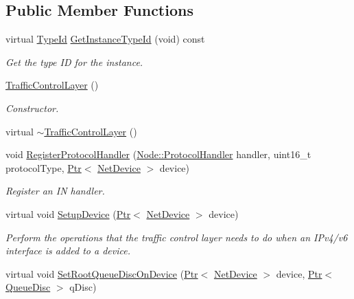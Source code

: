 \subsection*{Public Member Functions}
\begin{DoxyCompactItemize}
\item 
virtual \hyperlink{classns3_1_1TypeId}{Type\+Id} \hyperlink{classns3_1_1TrafficControlLayer_abe3b878f566ff58d4dcadc2e193f40f5}{Get\+Instance\+Type\+Id} (void) const 
\begin{DoxyCompactList}\small\item\em Get the type ID for the instance. \end{DoxyCompactList}\item 
\hyperlink{classns3_1_1TrafficControlLayer_a5e01ca7f1b266b684104985fc835c5f2}{Traffic\+Control\+Layer} ()
\begin{DoxyCompactList}\small\item\em Constructor. \end{DoxyCompactList}\item 
virtual \hyperlink{classns3_1_1TrafficControlLayer_aa08e8ce5078fce7ff3128a41d3b29366}{$\sim$\+Traffic\+Control\+Layer} ()
\item 
void \hyperlink{classns3_1_1TrafficControlLayer_af1aa1791591898efe876969ab78f4a9b}{Register\+Protocol\+Handler} (\hyperlink{classns3_1_1Node_a4ce20b9442f89703d242ce3a3fa3dbf2}{Node\+::\+Protocol\+Handler} handler, uint16\+\_\+t protocol\+Type, \hyperlink{classns3_1_1Ptr}{Ptr}$<$ \hyperlink{classns3_1_1NetDevice}{Net\+Device} $>$ device)
\begin{DoxyCompactList}\small\item\em Register an IN handler. \end{DoxyCompactList}\item 
virtual void \hyperlink{classns3_1_1TrafficControlLayer_ac60c5208106f39f7ad25082083ed48a0}{Setup\+Device} (\hyperlink{classns3_1_1Ptr}{Ptr}$<$ \hyperlink{classns3_1_1NetDevice}{Net\+Device} $>$ device)
\begin{DoxyCompactList}\small\item\em Perform the operations that the traffic control layer needs to do when an I\+Pv4/v6 interface is added to a device. \end{DoxyCompactList}\item 
virtual void \hyperlink{classns3_1_1TrafficControlLayer_ae44f2ceeba57ab2628cdda8c0c9e12fc}{Set\+Root\+Queue\+Disc\+On\+Device} (\hyperlink{classns3_1_1Ptr}{Ptr}$<$ \hyperlink{classns3_1_1NetDevice}{Net\+Device} $>$ device, \hyperlink{classns3_1_1Ptr}{Ptr}$<$ \hyperlink{classns3_1_1QueueDisc}{Queue\+Disc} $>$ q\+Disc)

\end{DoxyCompactItemize}
